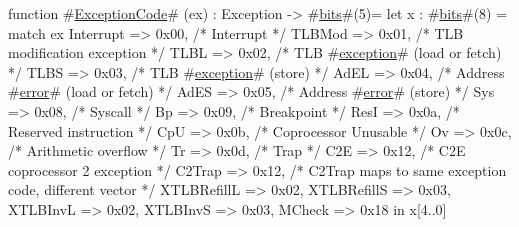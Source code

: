 function #\hyperref[sailMIPSzExceptionCode]{ExceptionCode}# (ex) : Exception -> #\hyperref[sailMIPSzbits]{bits}#(5)=
   let x : #\hyperref[sailMIPSzbits]{bits}#(8) = match ex
   {
      Interrupt    => 0x00, /* Interrupt */
      TLBMod       => 0x01, /* TLB modification exception */
      TLBL         => 0x02, /* TLB #\hyperref[sailMIPSzexception]{exception}# (load or fetch) */
      TLBS         => 0x03, /* TLB #\hyperref[sailMIPSzexception]{exception}# (store) */
      AdEL         => 0x04, /* Address #\hyperref[sailMIPSzerror]{error}# (load or fetch) */
      AdES         => 0x05, /* Address #\hyperref[sailMIPSzerror]{error}# (store) */
      Sys          => 0x08, /* Syscall */
      Bp           => 0x09, /* Breakpoint */
      ResI         => 0x0a, /* Reserved instruction */
      CpU          => 0x0b, /* Coprocessor Unusable */
      Ov           => 0x0c, /* Arithmetic overflow */
      Tr           => 0x0d, /* Trap */
      C2E          => 0x12, /* C2E coprocessor 2 exception */
      C2Trap       => 0x12, /* C2Trap maps to same exception code, different vector */
      XTLBRefillL  => 0x02,
      XTLBRefillS  => 0x03,
      XTLBInvL     => 0x02,
      XTLBInvS     => 0x03,
      MCheck       => 0x18
   } in x[4..0]
